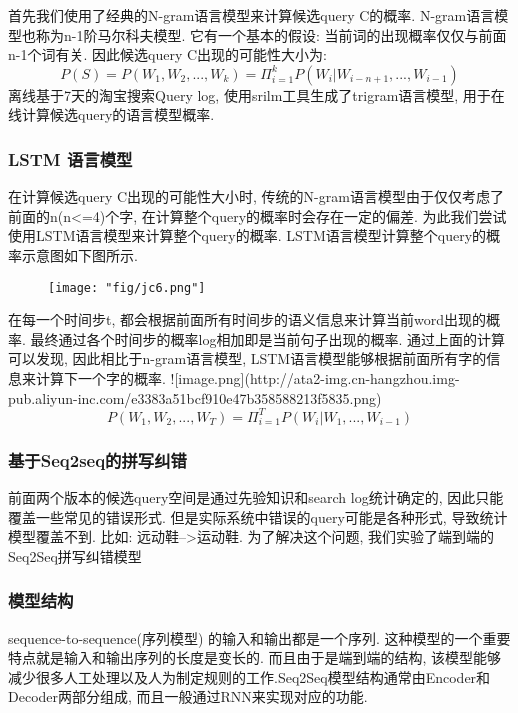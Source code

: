 首先我们使用了经典的N-gram语言模型来计算候选query C的概率. N-gram语言模型也称为n-1阶马尔科夫模型. 它有一个基本的假设: 当前词的出现概率仅仅与前面n-1个词有关. 因此候选query C出现的可能性大小为:
$$ P(S) = P(W_1,W_2,...,W_k) = \Pi^k_{i=1}P(W_i|W_{i-n+1},...,W_{i-1}) $$
离线基于7天的淘宝搜索Query log, 使用srilm工具生成了trigram语言模型, 用于在线计算候选query的语言模型概率.
\subsubsection{LSTM 语言模型}

在计算候选query C出现的可能性大小时, 传统的N-gram语言模型由于仅仅考虑了前面的n(n<=4)个字, 在计算整个query的概率时会存在一定的偏差. 为此我们尝试使用LSTM语言模型来计算整个query的概率. 
LSTM语言模型计算整个query的概率示意图如下图所示.

\begin{figure}[!h]
	\centering
	\texttt{[image: "fig/jc6.png"]}
	\caption{}
	\label{fig:jc6}
\end{figure}

在每一个时间步t, 都会根据前面所有时间步的语义信息来计算当前word出现的概率. 最终通过各个时间步的概率log相加即是当前句子出现的概率. 通过上面的计算可以发现, 因此相比于n-gram语言模型, LSTM语言模型能够根据前面所有字的信息来计算下一个字的概率.
![image.png](http://ata2-img.cn-hangzhou.img-pub.aliyun-inc.com/e3383a51bcf910e47b358588213f5835.png)
$$ P(W_1,W_2,...,W_T) = \Pi^T_{i=1}P(W_i|W_1,...,W_{i-1}) $$

\subsubsection{基于Seq2seq的拼写纠错}

前面两个版本的候选query空间是通过先验知识和search log统计确定的, 因此只能覆盖一些常见的错误形式. 但是实际系统中错误的query可能是各种形式, 导致统计模型覆盖不到. 比如: 远动鞋-->运动鞋. 为了解决这个问题, 我们实验了端到端的Seq2Seq拼写纠错模型

\subsubsection{模型结构}

sequence-to-sequence(序列模型) 的输入和输出都是一个序列. 这种模型的一个重要特点就是输入和输出序列的长度是变长的. 而且由于是端到端的结构, 该模型能够减少很多人工处理以及人为制定规则的工作.Seq2Seq模型结构通常由Encoder和Decoder两部分组成, 而且一般通过RNN来实现对应的功能.

